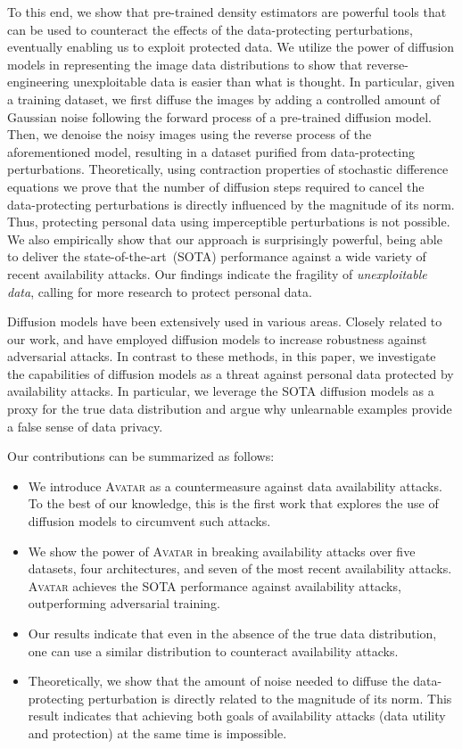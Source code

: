 \documentclass[conference]{IEEEtran}
\theoremstyle{definition}
\theoremstyle{remark}
\theoremstyle{proposition}
\begin{document}
To this end, we show that pre-trained density estimators are powerful tools that can be used to counteract the effects of the data-protecting perturbations, eventually enabling us to exploit protected data.
We utilize the power of diffusion models in representing the image data distributions to show that reverse-engineering unexploitable data is easier than what is thought.
In particular, given a training dataset, we first diffuse the images by adding a controlled amount of Gaussian noise following the forward process of a pre-trained diffusion model.
Then, we denoise the noisy images using the reverse process of the aforementioned model, resulting in a dataset purified from data-protecting perturbations.
Theoretically, using contraction properties of stochastic difference equations we prove that the number of diffusion steps required to cancel the data-protecting perturbations is directly influenced by the magnitude of its norm.
Thus, protecting personal data using imperceptible perturbations is not possible.
We also empirically show that our approach is surprisingly powerful, being able to deliver the state-of-the-art~(SOTA) performance against a wide variety of recent availability attacks.
Our findings indicate the fragility of \textit{unexploitable data}, calling for more research to protect personal data.

Diffusion models have been extensively used in various areas.
Closely related to our work, \citet{yoon2021adp} and \citet{nie2022diffpure} have employed diffusion models to increase robustness against adversarial attacks.
In contrast to these methods, in this paper, we investigate the capabilities of diffusion models as a threat against personal data protected by availability attacks.
In particular, we leverage the SOTA diffusion models as a proxy for the true data distribution and argue why unlearnable examples provide a false sense of data privacy.

Our contributions can be summarized as follows:
\begin{itemize}
    \item We introduce \textsc{Avatar} as a countermeasure against data availability attacks. To the best of our knowledge, this is the first work that explores the use of diffusion models to circumvent such attacks.
	\item We show the power of \textsc{Avatar} in breaking availability attacks over five datasets, four architectures, and seven of the most recent availability attacks. \textsc{Avatar} achieves the SOTA performance against availability attacks, outperforming adversarial training.
    \item Our results indicate that even in the absence of the true data distribution, one can use a similar distribution to counteract availability attacks.
    \item Theoretically, we show that the amount of noise needed to diffuse the data-protecting perturbation is directly related to the magnitude of its norm. This result indicates that achieving both goals of availability attacks (data utility and protection) at the same time is impossible.
\end{itemize}
\end{document}
